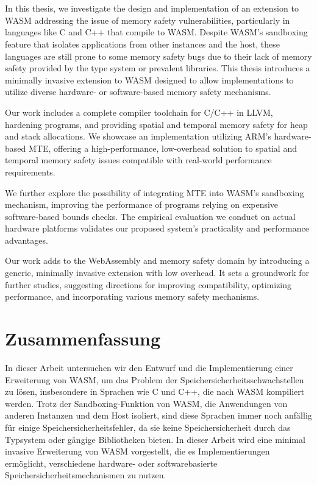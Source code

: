 \chapter{\abstractname}
\label{ch:abstract}

In this thesis, we investigate the design and implementation of an extension to \acf*{WASM} addressing the issue of memory safety vulnerabilities, particularly in languages like C and C++ that compile to \acs*{WASM}.
Despite \acs*{WASM}'s sandboxing feature that isolates applications from other instances and the host, these languages are still prone to some memory safety bugs due to their lack of memory safety provided by the type system or prevalent libraries.
This thesis introduces a minimally invasive extension to \acs*{WASM} designed to allow implementations to utilize diverse hardware- or software-based memory safety mechanisms.

Our work includes a complete compiler toolchain for C/C++ in LLVM, hardening programs, and providing spatial and temporal memory safety for heap and stack allocations.
We showcase an implementation utilizing ARM's hardware-based \acf*{MTE}, offering a high-performance, low-overhead solution to spatial and temporal memory safety issues compatible with real-world performance requirements.

We further explore the possibility of integrating \acs*{MTE} into \acs*{WASM}'s sandboxing mechanism, improving the performance of programs relying on expensive software-based bounds checks.
The empirical evaluation we conduct on actual hardware platforms validates our proposed system's practicality and performance advantages.

Our work adds to the WebAssembly and memory safety domain by introducing a generic, minimally invasive extension with low overhead.
It sets a groundwork for further studies, suggesting directions for improving compatibility, optimizing performance, and incorporating various memory safety mechanisms.


\chapter{Zusammenfassung}
\label{ch:zusammenfassung}

In dieser Arbeit untersuchen wir den Entwurf und die Implementierung einer Erweiterung von \acf*{WASM}, um das Problem der Speichersicherheitsschwachstellen zu lösen, insbesondere in Sprachen wie C und C++, die nach \acs*{WASM} kompiliert werden.
Trotz der Sandboxing-Funktion von \acs*{WASM}, die Anwendungen von anderen Instanzen und dem Host isoliert, sind diese Sprachen immer noch anfällig für einige Speichersicherheitsfehler, da sie keine Speichersicherheit durch das Typsystem oder gängige Bibliotheken bieten.
In dieser Arbeit wird eine minimal invasive Erweiterung von \acs*{WASM} vorgestellt, die es Implementierungen ermöglicht, verschiedene hardware- oder softwarebasierte Speichersicherheitsmechanismen zu nutzen.

